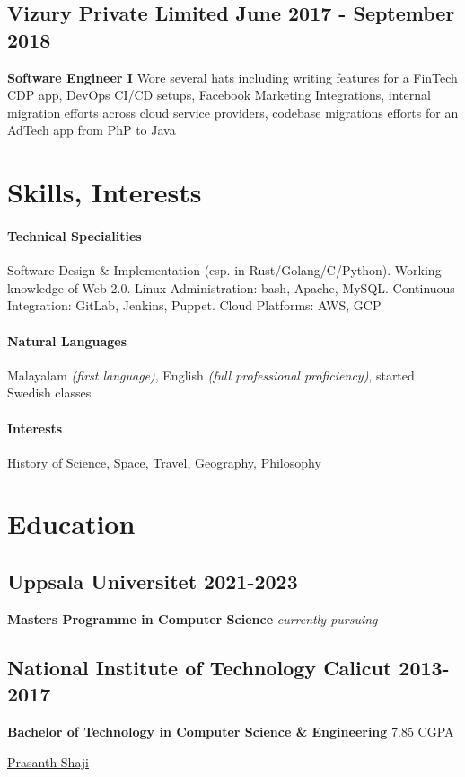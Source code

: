 \documentclass{scrartcl}
\begin{document}
		\subsection[Vizury]{Vizury Private Limited \hfill {\normalfont June 2017 - September 2018}}
		\textbf{Software Engineer I}
		Wore several hats including writing features for a FinTech CDP app, DevOps CI/CD setups, Facebook Marketing Integrations, internal migration efforts across cloud service providers, codebase migrations efforts for an AdTech app from PhP to Java


	\section{Skills, Interests}
		\paragraph{Technical Specialities} Software Design \& Implementation (esp. in Rust/Golang/C/Python). Working knowledge of Web 2.0. Linux Administration: bash, Apache, MySQL. Continuous Integration: GitLab, Jenkins, Puppet. Cloud Platforms: AWS, GCP
		\paragraph{Natural Languages} Malayalam \textit{(first language)}, English \textit{(full professional proficiency)}, started Swedish classes
		\paragraph{Interests} History of Science, Space, Travel, Geography, Philosophy

	\section{Education}
		\subsection[Uppsala Universitet]{Uppsala Universitet \hfill 2021-2023}
		\textbf{Masters Programme in Computer Science} \hfill \textit{currently pursuing}
		\subsection[NITC]{National Institute of Technology Calicut \hfill 2013-2017}
		\textbf{Bachelor of Technology in Computer Science \& Engineering} \hfill 7.85 CGPA

	\vfill

	\begin{center}
		 \href{https://www.linkedin.com/in/prasanth-shaji-65338b92/}{Prasanth Shaji}
	\end{center}
\end{document}

